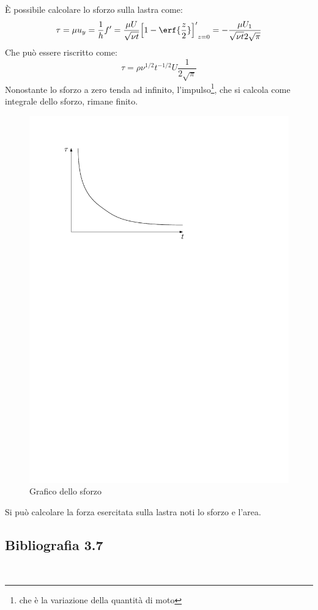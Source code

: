 È possibile calcolare lo sforzo sulla lastra come:
%
	\begin{equation*}
		\tau = \mu u_y = \frac{1}{h} f' = \frac{\mu U}{\sqrt{\nu t}} {\left[ 1 - \erf{\frac{z}{2}} \right]'}_{z=0} = - \frac{\mu U_1}{\sqrt{\nu t} 2 \sqrt{\pi}}
	\end{equation*}
%
Che può essere riscritto come:
%
	\begin{equation*}
		\tau = \rho {\nu}^{1/2} t^{-1/2} U \frac{1}{2 \sqrt{\pi}}
	\end{equation*}
%
Nonostante lo sforzo a zero tenda ad infinito, l'impulso\footnote{che è la variazione della quantità di moto}, che si calcola come integrale dello sforzo, rimane finito.
	\begin{figure}[ht]
		\includegraphics[scale=0.7]{./3.6 Soluzioni esatte equazioni di Navier-Stokes/3.6-14}
		\centering
		\caption{Grafico dello sforzo}
	\end{figure}
%
Si può calcolare la forza esercitata sulla lastra noti lo sforzo e l'area.

\subsection*{Bibliografia 3.7}
\cite[Cap.\ 9.5, 9.6]{CengelCimbala}\\
\cite[Cap.\ 6.1, 6.2, 6.3, 6.4, 6.5]{PnueliGutfinger}